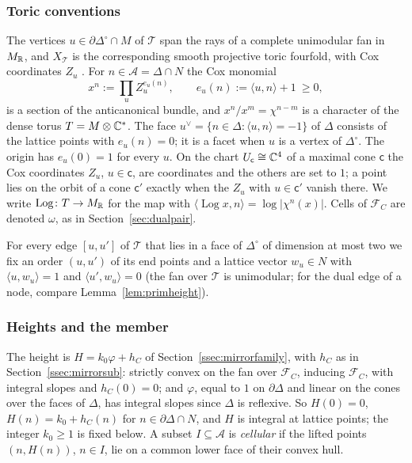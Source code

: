 \subsubsection*{Toric conventions}
The vertices $u\in\partial\Delta^\circ\cap M$ of $\mathcal T$ span the rays of a complete unimodular fan in $M_\mathbb R$, and
$X_{\mathcal T}$ is the corresponding smooth projective toric fourfold, with Cox coordinates $Z_u$ \cite{CLS}. For $n\in\mathcal A=\Delta\cap N$ the Cox monomial
\[
x^n:=\prod_uZ_u^{e_u(n)},\qquad e_u(n):=\langle u,n\rangle+1\ \ge0,
\]
is a section of the anticanonical bundle, and $x^n/x^m=\chi^{n-m}$ is a character of the dense torus $T=M\otimes\mathbb C^*$.
The face $u^\vee=\{n\in\Delta:\langle u,n\rangle=-1\}$ of $\Delta$ consists of the lattice points with $e_u(n)=0$; it is
a facet when $u$ is a vertex of $\Delta^\circ$. The origin has $e_u(0)=1$ for every $u$. On the chart
$U_{\mathsf c}\cong\mathbb C^4$ of a maximal cone $\mathsf c$ the Cox coordinates $Z_u$, $u\in\mathsf c$, are coordinates and the
others are set to $1$; a point lies on the orbit of a cone $\mathsf c'$ exactly when the $Z_u$ with $u\in\mathsf c'$ vanish
there. We
write $\operatorname{Log}\colon T\to M_\mathbb R$ for the map with $\langle\operatorname{Log}x,n\rangle=\log|\chi^n(x)|$. Cells of
$\mathcal F_C$ are denoted $\omega$, as in Section~\ref{sec:dualpair}.

For every edge $[u,u']$ of $\mathcal T$ that lies in a face of $\Delta^\circ$ of dimension at most two we fix an order
$(u,u')$ of its end points and a lattice vector $w_u\in N$ with $\langle u,w_u\rangle=1$ and $\langle u',w_u\rangle=0$
(the fan over $\mathcal T$ is unimodular; for the dual edge of a node, compare Lemma~\ref{lem:primheight}).

\subsubsection*{Heights and the member}
The height is $H=k_0\varphi+h_C$ of Section~\ref{ssec:mirrorfamily}, with $h_C$ as in Section~\ref{ssec:mirrorsub}: strictly
convex on the fan over $\mathcal F_C$, inducing $\mathcal F_C$, with integral slopes and $h_C(0)=0$; and $\varphi$, equal to
$1$ on $\partial\Delta$ and linear on the cones over the faces of $\Delta$, has integral slopes since $\Delta$ is reflexive.
So $H(0)=0$, $H(n)=k_0+h_C(n)$ for $n\in\partial\Delta\cap N$, and $H$ is integral at lattice points; the integer $k_0\ge1$
is fixed below. A subset $I\subseteq\mathcal A$ is \emph{cellular} if the lifted points
$(n,H(n))$, $n\in I$, lie on a common lower face of their convex hull.


